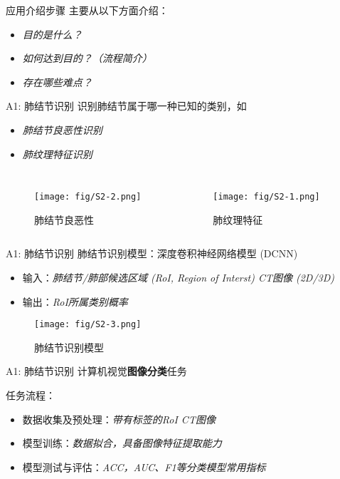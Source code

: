 \documentclass[10pt]{beamer}
\begin{document}
\begin{frame}{应用介绍步骤}
  主要从以下方面介绍：
  \begin{itemize}
    \item \textit{目的是什么？}
    \item \textit{如何达到目的？（流程简介）}
    \item \textit{存在哪些难点？}
  \end{itemize}
\end{frame}

\begin{frame}{A1: 肺结节识别}
  识别肺结节属于哪一种已知的类别，如
  \begin{itemize}
    \item \textit{肺结节良恶性识别}
    \item \textit{肺纹理特征识别}
  \end{itemize}
  \begin{columns}[T,onlytextwidth]
    \begin{figure}[htbp]
      \centering
      \texttt{[image: fig/S2-2.png]}   
      \caption{肺结节良恶性}
    \end{figure}
    \begin{figure}[htbp]
      \centering
      \texttt{[image: fig/S2-1.png]}
      \caption{肺纹理特征}
    \end{figure}
  \end{columns}
\end{frame}

\begin{frame}{A1: 肺结节识别}
  肺结节识别模型：深度卷积神经网络模型 (DCNN)
  \begin{itemize}
    \item 输入：\textit{肺结节/肺部候选区域 (RoI, Region of Interst) CT图像 (2D/3D)}
    \item 输出：\textit{RoI所属类别概率}
  \end{itemize}
  \begin{figure}[htbp]
      \centering
      \texttt{[image: fig/S2-3.png]}
      \caption{肺结节识别模型}
  \end{figure}
\end{frame}

\begin{frame}{A1: 肺结节识别}
  计算机视觉\textbf{图像分类}任务
  \vspace{5 mm}

  任务流程：
  \begin{itemize}
    \item 数据收集及预处理：\textit{带有标签的RoI CT图像}
    \item 模型训练：\textit{数据拟合，具备图像特征提取能力}
    \item 模型测试与评估：\textit{ACC，AUC、F1等分类模型常用指标}
  \end{itemize}
\end{frame}
\end{document}
